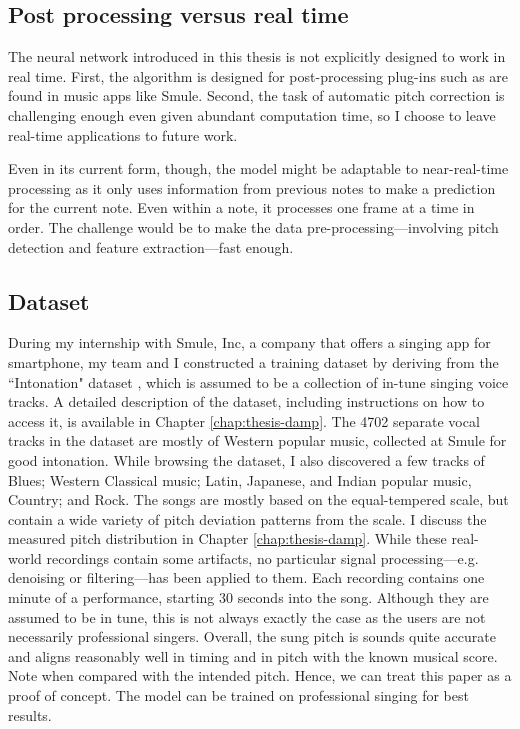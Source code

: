 \subsection{Post processing versus real time}
The neural network introduced in this thesis is not explicitly designed to work in real time. First, the algorithm is designed for post-processing plug-ins such as are found in music apps like Smule. Second, the task of automatic pitch correction is challenging enough even given abundant computation time, so I choose to leave real-time applications to future work. 

Even in its current form, though, the model might be adaptable to near-real-time processing as it only uses information from previous notes to make a prediction for the current note. Even within a note, it processes one frame at a time in order. The challenge would be to make the data pre-processing---involving pitch detection and feature extraction---fast enough. 

\subsection{Dataset}
\label{sec:dataset-autotune}
During my internship with Smule, Inc, a company that offers a singing app for smartphone, my team and I constructed a training dataset by deriving from the ``Intonation" dataset \cite{wager2018intonation}, which is assumed to be a collection of in-tune singing voice tracks. A detailed description of the dataset, including instructions on how to access it, is available in Chapter \ref{chap:thesis-damp}. The 4702 separate vocal tracks in the dataset are mostly of Western popular music, collected at Smule for good intonation. While browsing the dataset, I also discovered a few tracks of Blues; Western Classical music; Latin, Japanese, and Indian popular music, Country; and Rock. The songs are mostly based on the equal-tempered scale, but contain a wide variety of pitch deviation patterns from the scale. I discuss the measured pitch distribution in Chapter \ref{chap:thesis-damp}. While these real-world recordings contain some artifacts, no particular signal processing---e.g. denoising or filtering---has been applied to them. Each recording contains one minute of a performance, starting 30 seconds into the song. Although they are assumed to be in tune, this is not always exactly the case as the users are not necessarily professional singers. Overall, the sung pitch is sounds quite accurate and aligns reasonably well in timing and in pitch with the known musical score. Note when compared with the intended pitch. Hence, we can treat this paper as a proof of concept. The model can be trained on professional singing for best results.

